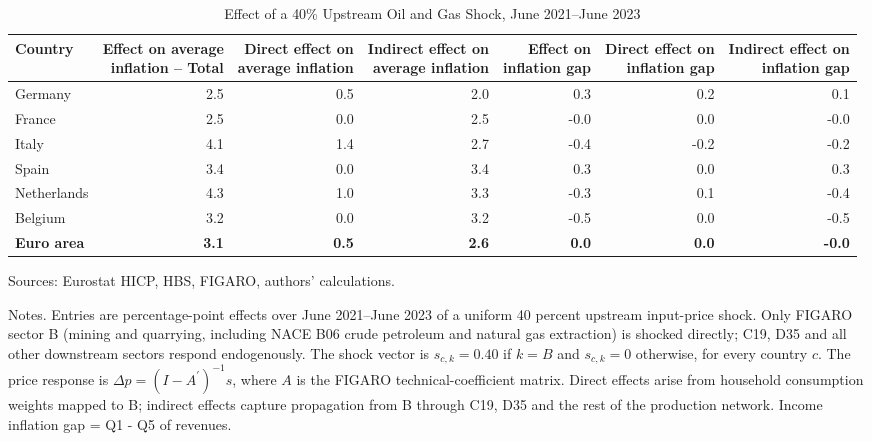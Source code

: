 \documentclass[11pt]{article}
\begin{document}
\begin{table}[H]
\centering
\caption{Effect of a 40\% Upstream Oil and Gas Shock, June 2021--June 2023}
\scriptsize
\setlength{\tabcolsep}{4.2pt}
\begin{tabular}{lrrrrrr}
\toprule
Country & \shortstack{Effect on average\\inflation -- Total} & \shortstack{Direct effect on\\average inflation} & \shortstack{Indirect effect on\\average inflation} & \shortstack{Effect on\\inflation gap} & \shortstack{Direct effect on\\inflation gap} & \shortstack{Indirect effect on\\inflation gap}
 \\
\midrule
Germany & 2.5 & 0.5 & 2.0 & 0.3 & 0.2 & 0.1
 \\
France & 2.5 & 0.0 & 2.5 & -0.0 & 0.0 & -0.0
 \\
Italy & 4.1 & 1.4 & 2.7 & -0.4 & -0.2 & -0.2
 \\
Spain & 3.4 & 0.0 & 3.4 & 0.3 & 0.0 & 0.3
 \\
Netherlands & 4.3 & 1.0 & 3.3 & -0.3 & 0.1 & -0.4
 \\
Belgium & 3.2 & 0.0 & 3.2 & -0.5 & 0.0 & -0.5
 \\
\midrule
\textbf{Euro area} & \textbf{3.1} & \textbf{0.5} & \textbf{2.6} & \textbf{0.0} & \textbf{0.0} & \textbf{-0.0}
 \\
\bottomrule
\end{tabular}
\par\vspace{0.35em}\footnotesize\noindent Sources: Eurostat HICP, HBS, FIGARO, authors' calculations.
\par\vspace{0.25em}\footnotesize\noindent Notes. Entries are percentage-point effects over June 2021--June 2023 of a uniform 40 percent upstream input-price shock. Only FIGARO sector B (mining and quarrying, including NACE B06 crude petroleum and natural gas extraction) is shocked directly; C19, D35 and all other downstream sectors respond endogenously. The shock vector is $s_{c,k}=0.40$ if $k=B$ and $s_{c,k}=0$ otherwise, for every country $c$. The price response is $\Delta p = (I - A^{\prime})^{-1}s$, where $A$ is the FIGARO technical-coefficient matrix. Direct effects arise from household consumption weights mapped to B; indirect effects capture propagation from B through C19, D35 and the rest of the production network. Income inflation gap = Q1 - Q5 of revenues.
\end{table}
\vspace{0.6em}
\end{document}
